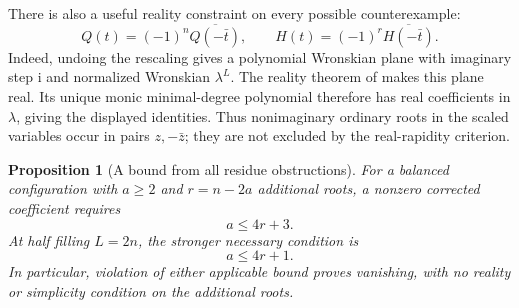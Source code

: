 \documentclass[11pt]{article}
\newtheorem{proposition}{Proposition}[section]
\theoremstyle{definition}
\newcommand{\ii}{\mathrm i}
\begin{document}
There is also a useful reality constraint on every possible
counterexample:
\[
 Q(t)=(-1)^n\overline{Q(-\bar t)},\qquad
 H(t)=(-1)^r\overline{H(-\bar t)}.
\]
Indeed, undoing the rescaling gives a polynomial Wronskian plane
with imaginary step $\ii$ and normalized Wronskian $\lambda^L$.
The reality theorem of \cite[Theorem~1.1]{MTV2011} makes this plane
real. Its unique monic minimal-degree polynomial therefore has real
coefficients in $\lambda$, giving the displayed identities. Thus
nonimaginary ordinary roots in the scaled variables occur in pairs
$z,-\bar z$; they are not excluded by the real-rapidity criterion.

\begin{proposition}[A bound from all residue obstructions]
\label{prop:balanced-multiplicity-bound}
For a balanced configuration with $a\ge2$ and $r=n-2a$ additional
roots, a nonzero corrected coefficient requires
\begin{equation}\label{eq:balanced-multiplicity-bound}
 a\le4r+3.
\end{equation}
At half filling $L=2n$, the stronger necessary condition is
\begin{equation}\label{eq:balanced-half-filling-bound}
 a\le4r+1.
\end{equation}
In particular, violation of either applicable bound proves vanishing,
with no reality or simplicity condition on the additional roots.
\end{proposition}
\end{document}
